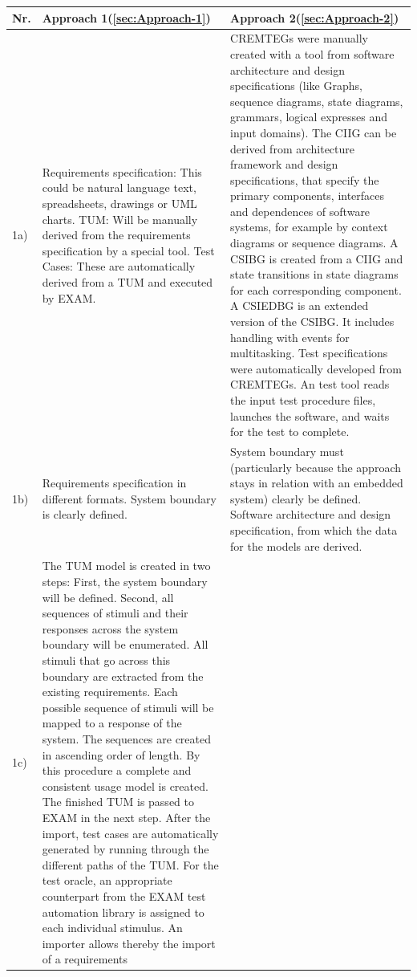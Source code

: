 \begin{small} 		
	\begin{longtable}[h]{p{0.45cm}|p{}|p{}}
\hline 
\textbf{Nr.} & \textbf {Approach 1(\autoref{sec:Approach-1})}  & \textbf{Approach 2(\autoref{sec:Approach-2})}\\
\hline 
1a)  & Requirements specification: This could be natural language text, spreadsheets,
drawings or UML charts. TUM: Will be manually derived from the requirements
specification by a special tool. Test Cases: These are automatically
derived from a TUM and executed by EXAM.  & CREMTEGs were manually created with a tool from software architecture
and design specifications (like Graphs, sequence diagrams, state diagrams,
grammars, logical expresses and input domains). The CIIG can be derived
from architecture framework and design specifications, that specify
the primary components, interfaces and dependences of software systems,
for example by context diagrams or sequence diagrams. A CSIBG is created
from a CIIG and state transitions in state diagrams for each corresponding
component. A CSIEDBG is an extended version of the CSIBG. It includes
handling with events for multitasking. Test specifications were automatically
developed from CREMTEGs. An test tool reads the input test procedure
files, launches the software, and waits for the test to complete.\\
\hline 
1b) & Requirements specification in different formats. System boundary is
clearly defined.  & System boundary must (particularly because the approach stays in relation
with an embedded system) clearly be defined. Software architecture
and design specification, from which the data for the models are derived.\\
\hline 
1c)  & The TUM model is created in two steps: First, the system boundary
will be defined. Second, all sequences of stimuli and their responses
across the system boundary will be enumerated. All stimuli that go
across this boundary are extracted from the existing requirements.
Each possible sequence of stimuli will be mapped to a response of
the system. The sequences are created in ascending order of length.
By this procedure a complete and consistent usage model is created.
The finished TUM is passed to EXAM in the next step. After the import,
test cases are automatically generated by running through the different
paths of the TUM. For the test oracle, an appropriate counterpart
from the EXAM test automation library is assigned to each individual
stimulus. An importer allows thereby the import of a requirements

\end{longtable}
\end{small}
